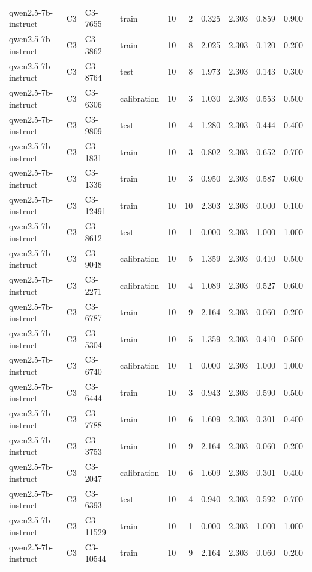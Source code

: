 \begin{table}
\begin{tabular}{llllrrrrrr}
qwen2.5-7b-instruct & C3 & C3-7655 & train & 10 & 2 & 0.325 & 2.303 & 0.859 & 0.900 \\
qwen2.5-7b-instruct & C3 & C3-3862 & train & 10 & 8 & 2.025 & 2.303 & 0.120 & 0.200 \\
qwen2.5-7b-instruct & C3 & C3-8764 & test & 10 & 8 & 1.973 & 2.303 & 0.143 & 0.300 \\
qwen2.5-7b-instruct & C3 & C3-6306 & calibration & 10 & 3 & 1.030 & 2.303 & 0.553 & 0.500 \\
qwen2.5-7b-instruct & C3 & C3-9809 & test & 10 & 4 & 1.280 & 2.303 & 0.444 & 0.400 \\
qwen2.5-7b-instruct & C3 & C3-1831 & train & 10 & 3 & 0.802 & 2.303 & 0.652 & 0.700 \\
qwen2.5-7b-instruct & C3 & C3-1336 & train & 10 & 3 & 0.950 & 2.303 & 0.587 & 0.600 \\
qwen2.5-7b-instruct & C3 & C3-12491 & train & 10 & 10 & 2.303 & 2.303 & 0.000 & 0.100 \\
qwen2.5-7b-instruct & C3 & C3-8612 & test & 10 & 1 & 0.000 & 2.303 & 1.000 & 1.000 \\
qwen2.5-7b-instruct & C3 & C3-9048 & calibration & 10 & 5 & 1.359 & 2.303 & 0.410 & 0.500 \\
qwen2.5-7b-instruct & C3 & C3-2271 & calibration & 10 & 4 & 1.089 & 2.303 & 0.527 & 0.600 \\
qwen2.5-7b-instruct & C3 & C3-6787 & train & 10 & 9 & 2.164 & 2.303 & 0.060 & 0.200 \\
qwen2.5-7b-instruct & C3 & C3-5304 & train & 10 & 5 & 1.359 & 2.303 & 0.410 & 0.500 \\
qwen2.5-7b-instruct & C3 & C3-6740 & calibration & 10 & 1 & 0.000 & 2.303 & 1.000 & 1.000 \\
qwen2.5-7b-instruct & C3 & C3-6444 & train & 10 & 3 & 0.943 & 2.303 & 0.590 & 0.500 \\
qwen2.5-7b-instruct & C3 & C3-7788 & train & 10 & 6 & 1.609 & 2.303 & 0.301 & 0.400 \\
qwen2.5-7b-instruct & C3 & C3-3753 & train & 10 & 9 & 2.164 & 2.303 & 0.060 & 0.200 \\
qwen2.5-7b-instruct & C3 & C3-2047 & calibration & 10 & 6 & 1.609 & 2.303 & 0.301 & 0.400 \\
qwen2.5-7b-instruct & C3 & C3-6393 & test & 10 & 4 & 0.940 & 2.303 & 0.592 & 0.700 \\
qwen2.5-7b-instruct & C3 & C3-11529 & train & 10 & 1 & 0.000 & 2.303 & 1.000 & 1.000 \\
qwen2.5-7b-instruct & C3 & C3-10544 & train & 10 & 9 & 2.164 & 2.303 & 0.060 & 0.200 \\

\end{tabular}
\end{table}
